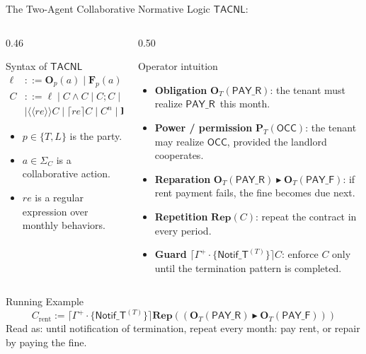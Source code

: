 \documentclass[9pt,aspectratio=169]{beamer}
\newcommand{\logic}[1]{\ensuremath{\mathsf{#1}}\xspace}
\newcommand{\cDL}{\logic{TACNL}}
\newcommand{\repair}{\ensuremath{\blacktriangleright}}
\newcommand{\obl}[2][]{\mathbf{O}_{#1}(#2)}
\newcommand{\frb}[2][]{\mathbf{F}_{#1}(#2)}
\newcommand{\perm}[2][]{\mathbf{P}_{#1}(#2)}
\newcommand{\repit}[1]{\mathbf{Rep}(#1)}
\newcommand{\guard}[2][]{\lceil #1 \rceil #2}
\newcommand{\trig}[2][]{\langle\!\langle #1 \rangle\!\rangle #2}
\newcommand{\PAY}{\ensuremath{\mathsf{PAY\_R}}\xspace}
\newcommand{\PAYF}{\ensuremath{\mathsf{PAY\_F}}\xspace}
\newcommand{\OCC}{\ensuremath{\mathsf{OCC}}\xspace}
\newcommand{\notifterm}{\ensuremath{\mathsf{Notif\_T}}}
\begin{document}
\begin{frame}{The Two-Agent Collaborative Normative Logic \cDL:}
\small
\begin{columns}[T,totalwidth=\textwidth]
\begin{column}{0.46\textwidth}
  \begin{block}{Syntax of \cDL}
    \scriptsize
    \[
    \begin{aligned}
    \ell &::= \obl[p]{a} \mid \frb[p]{a} \mid \perm[p]{a} \mid \top \mid \bot\\
    C &::= \ell \mid C \wedge C \mid C ; C \mid C \repair C\\
      &\mid \trig[re]{C} \mid \guard[re]{C} \mid C^n \mid \repit{C}
    \end{aligned}
    \]
    \vspace{-2mm}
    \begin{itemize}\setlength\itemsep{2pt}
      \item $p \in \{T,L\}$ is the party.
      \item $a \in \Sigma_C$ is a collaborative action.
      \item $re$ is a regular expression over monthly behaviors.
    \end{itemize}
  \end{block}
\end{column}

\begin{column}{0.50\textwidth}
  \begin{block}{Operator intuition}
    \scriptsize
    \begin{itemize}\setlength\itemsep{2pt}
      \item \textbf{Obligation} $\obl[T]{\PAY}$: the tenant must realize \PAY\ this month.
      \item \textbf{Power / permission} $\perm[T]{\OCC}$: the tenant may realize \OCC, provided the landlord cooperates.
      \item \textbf{Reparation} $\obl[T]{\PAY} \repair \obl[T]{\PAYF}$: if rent payment fails, the fine becomes due next.
      \item \textbf{Repetition} $\repit{C}$: repeat the contract in every period.
      \item \textbf{Guard} $\guard[\Gamma^+\!\cdot\!\{\notifterm^{(T)}\}]{C}$: enforce $C$ only until the termination pattern is completed.
    \end{itemize}
  \end{block}
\end{column}
\end{columns}
\vspace{-1mm}
\begin{block}{Running Example}
  \scriptsize
  \[
  C_{\text{rent}} :=
  \guard[\Gamma^+\!\cdot\!\{\notifterm^{(T)}\}]
  {\repit{\left(\obl[T]{\PAY}\repair\obl[T]{\PAYF}\right)}}
  \]
  Read as: until notification of termination, repeat every month: pay rent, or repair by paying the fine.
\end{block}
\end{frame}
\end{document}
